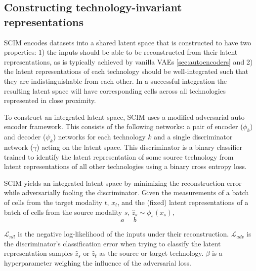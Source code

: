 \subsection{Constructing technology-invariant representations}
SCIM encodes datasets into a shared latent space that is constructed to have two properties:
1) the inputs should be able to be reconstructed from their latent representations, as is typically achieved by vanilla VAEs \ref{sec:autoencoders}
and 2) the latent representations of each technology should be well-integrated such that they are indistinguishable from each other.
In a successful integration the resulting latent space will have corresponding cells across all technologies represented in close proximity.

To construct an integrated latent space, SCIM uses a modified adversarial auto encoder framework.
This consists of the following networks: a pair of encoder ($\phi_k$) and decoder ($\psi_k$) networks for each technology $k$ and a single discriminator network ($\gamma$) acting on the latent space.
This discriminator is a binary classifier trained to identify the latent representation of some source technology from latent representations of all other technologies using a binary cross entropy loss.

SCIM yields an integrated latent space by minimizing the reconstruction error while adversarially fooling the discriminator.
Given the measurements of a batch of cells from the target modality $t$, $x_t$, and the (fixed) latent representations of a batch of cells from the source modality $s$, $\hat{z}_s \sim \phi_s(x_s)$,
\begin{equation}
	a = b
  \label{eq:scim-loss}
\end{equation}

$\mathcal{L}_{nll}$ is the negative log-likelihood of the inputs under their reconstruction.
$\mathcal{L}_{adv}$ is the discriminator’s classification error when trying to classify the latent representation samples $\hat{z}_s$ or $\hat{z}_t$ as the source or target technology.
$\beta$ is a hyperparameter weighing the influence of the adversarial loss.

